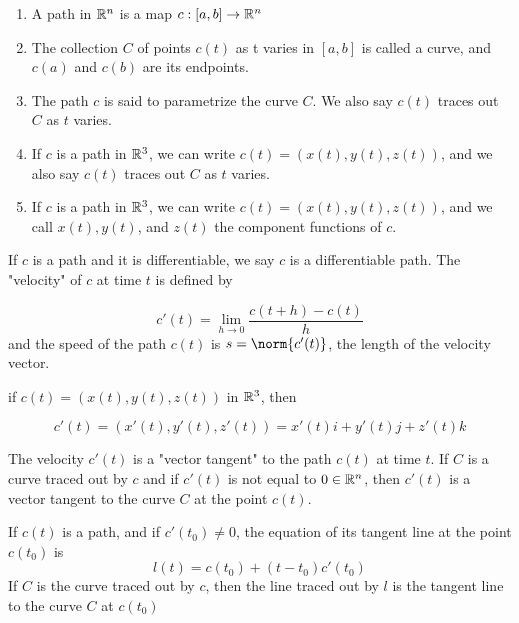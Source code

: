 \begin{defn}
	\begin{enumerate}[wide, label = $\bullet$]
		\item A path in $\mathbb{R}^n$ is a map $c:[a,b] \rightarrow \mathbb{R}^n$
		\item The collection $C$ of points $c(t)$ as t varies in $[a,b]$ is called a curve, and $c(a)$ and $c(b)$ are its endpoints.
		\item The path $c$ is said to parametrize the curve $C$. We also say $c(t)$ traces out $C$ as $t$ varies.
		\item If $c$ is a path in $\mathbb{R}^3$, we can write $c(t) = (x(t),y(t),z(t))$, and we also say $c(t)$ traces out $C$ as $t$ varies.
		\item If $c$ is a path in $\mathbb{R}^3$, we can write $c(t) = (x(t),y(t),z(t))$, and we call $x(t),y(t)$, and $z(t)$ the component functions of $c$.
	\end{enumerate}
	
\end{defn}

\begin{defn}
	If $c$ is a path and it is differentiable, we say $c$ is a differentiable path. The "velocity" of $c$ at time $t$ is defined by
	
	$$c'(t) = \lim_{h \rightarrow 0}\dfrac{c(t+h) - c(t)}{h}$$	
	and the speed of the path $c(t)$ is $s = \norm{c'(t)}$, the length of the velocity vector.
\end{defn}

\begin{rmk*}
	if $c(t) = (x(t),y(t),z(t))$ in $\mathbb{R}^3$, then
	
	$$c'(t) = (x'(t),y'(t),z'(t)) = x'(t)i + y'(t)j + z'(t)k$$	
\end{rmk*}

\begin{defn}
	The velocity $c'(t)$ is a "vector tangent" to the path $c(t)$ at time $t$. If $C$ is a curve traced out by $c$ and if $c'(t)$ is not equal to $0 \in \mathbb{R}^n$, then $c'(t)$ is a vector tangent to the curve $C$ at the point $c(t)$.	
\end{defn}


\begin{defn}
	If $c(t)$ is a path, and if $c'(t_0) \neq 0$, the equation of its tangent line at the point $c(t_0)$ is
	$$l(t) = c(t_0) + (t - t_0)c'(t_0)$$	
	If $C$ is the curve traced out by $c$, then the line traced out by $l$ is the tangent line to the curve $C$ at $c(t_0)$
\end{defn}

